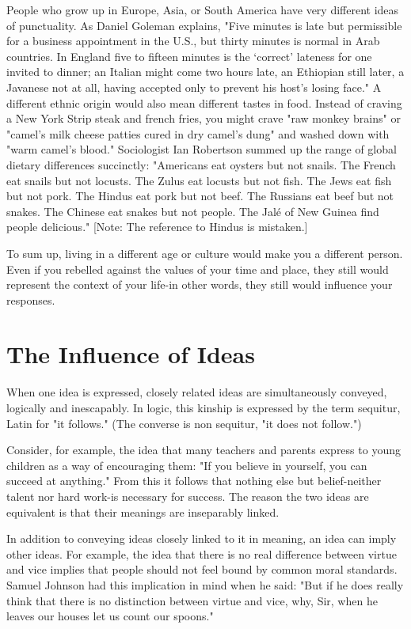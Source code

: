 \documentclass{book}
\begin{document}
People who grow up in Europe, Asia, or South America have very different ideas of punctuality. As Daniel Goleman explains, "Five minutes is late but permissible for a business appointment in the U.S., but thirty minutes is normal in Arab countries. In England five to fifteen minutes is the ‘correct’ lateness for one invited to dinner; an Italian might come two hours late, an Ethiopian still later, a Javanese not at all, having accepted only to prevent his host’s losing face." A different ethnic origin would also mean different tastes in food. Instead of craving a New York Strip steak and french fries, you might crave "raw monkey brains" or "camel’s milk cheese patties cured in dry camel’s dung" and washed down with "warm camel’s blood." Sociologist Ian Robertson summed up the range of global dietary differences succinctly: "Americans eat oysters but not snails. The French eat snails but not locusts. The Zulus eat locusts but not fish. The Jews eat fish but not pork. The Hindus eat pork but not beef. The Russians eat beef but not snakes. The Chinese eat snakes but not people. The Jalé of New Guinea find people delicious." [Note: The reference to Hindus is mistaken.]

To sum up, living in a different age or culture would make you a different person. Even if you rebelled against the values of your time and place, they still would represent the context of your life-in other words, they still would influence your responses.

\section{The Influence of Ideas}

When one idea is expressed, closely related ideas are simultaneously conveyed, logically and inescapably. In logic, this kinship is expressed by the term sequitur, Latin for "it follows." (The converse is non sequitur, "it does not follow.")

Consider, for example, the idea that many teachers and parents express to young children as a way of encouraging them: "If you believe in yourself, you can succeed at anything." From this it follows that nothing else but belief-neither talent nor hard work-is necessary for success. The reason the two ideas are equivalent is that their meanings are inseparably linked.

In addition to conveying ideas closely linked to it in meaning, an idea can imply other ideas. For example, the idea that there is no real difference between virtue and vice implies that people should not feel bound by common moral standards. Samuel Johnson had this implication in mind when he said: "But if he does really think that there is no distinction between virtue and vice, why, Sir, when he leaves our houses let us count our spoons."
\end{document}
